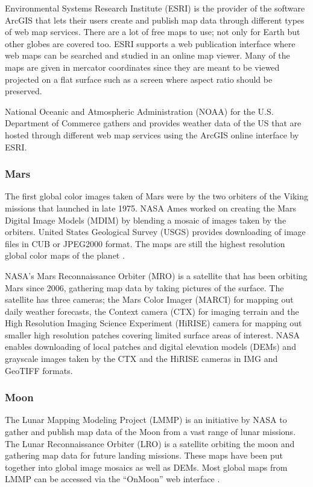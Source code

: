 Environmental Systems Research Institute (ESRI) is the provider of the software ArcGIS that lets their users create and publish map data through different types of web map services. There are a lot of free maps to use; not only for Earth but other globes are covered too. ESRI supports a web publication interface where web maps can be searched and studied in an online map viewer. Many of the maps are given in mercator coordinates since they are meant to be viewed projected on a flat surface such as a screen where aspect ratio should be preserved.

National Oceanic and Atmospheric Administration (NOAA) for the U.S. Department of Commerce gathers and provides weather data of the US that are hosted through different web map services using the ArcGIS online \cite{arcgis} interface by ESRI.

\subsubsection{Mars}

The first global color images taken of Mars were by the two orbiters of the Viking missions that launched in late 1975. NASA Ames worked on creating the Mars Digital Image Models (MDIM) by blending a mosaic of images taken by the orbiters. United States Geological Survey (USGS) provides downloading of image files in CUB or JPEG2000 format. The maps are still the highest resolution global color maps of the planet \cite{viking}.

NASA's Mars Reconnaissance Orbiter (MRO) is a satellite that has been orbiting Mars since 2006, gathering map data by taking pictures of the surface. The satellite has three cameras; the Mars Color Imager (MARCI) for mapping out daily weather forecasts, the Context camera (CTX) for imaging terrain and the High Resolution Imaging Science Experiment (HiRISE) camera for mapping out smaller high resolution patches covering limited surface areas of interest. NASA enables downloading of local patches and digital elevation models (DEMs) and grayscale images taken by the CTX \cite{ctx} and the HiRISE \cite{hirise} cameras in IMG and GeoTIFF formats.

\subsubsection{Moon}

The Lunar Mapping Modeling Project (LMMP) is an initiative by NASA to gather and publish map data of the Moon from a vast range of lunar missions. The Lunar Reconnaissance Orbiter (LRO) is a satellite orbiting the moon and gathering map data for future landing missions. These maps have been put together into global image mosaics as well as DEMs. Most global maps from LMMP can be accessed via the ``OnMoon'' web interface \cite{onmoon}.



